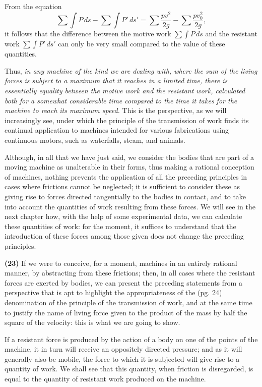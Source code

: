 \documentclass{book}
\begin{document}
From the equation \[\sum \int P \, ds - \sum \int P' \, ds' = \sum \frac{pv^2}{2g} - \sum \frac{pv_0^2}{2g},\] it follows that the difference between the motive work \(\sum \int P \, ds\) and the resistant work \(\sum \int P' \, ds'\) can only be very small compared to the value of these quantities. 

Thus, \textit{in any machine of the kind we are dealing with, where the sum of the living forces is subject to a maximum that it reaches in a limited time, there is essentially equality between the motive work and the resistant work, calculated both for a somewhat considerable time compared to the time it takes for the machine to reach its maximum speed.} This is the perspective, as we will increasingly see, under which the principle of the transmission of work finds its continual application to machines intended for various fabrications using continuous motors, such as waterfalls, steam, and animals.

Although, in all that we have just said, we consider the bodies that are part of a moving machine as unalterable in their forms, thus making a rational conception of machines, nothing prevents the application of all the preceding principles in cases where frictions cannot be neglected; it is sufficient to consider these as giving rise to forces directed tangentially to the bodies in contact, and to take into account the quantities of work resulting from these forces. We will see in the next chapter how, with the help of some experimental data, we can calculate these quantities of work: for the moment, it suffices to understand that the introduction of these forces among those given does not change the preceding principles.

\textbf{(23)} If we were to conceive, for a moment, machines in an entirely rational manner, by abstracting from these frictions; then, in all cases where the resistant forces are exerted by bodies, we can present the preceding statements from a perspective that is apt to highlight the appropriateness of the
\newpage
(pg. 24)\\
denomination of the principle of the transmission of work, and at the same time to justify the name of living force given to the product of the mass by half the square of the velocity: this is what we are going to show.

If a resistant force is produced by the action of a body on one of the points of the machine, it in turn will receive an oppositely directed pressure; and as it will generally also be mobile, the force to which it is subjected will give rise to a quantity of work. We shall see that this quantity, when friction is disregarded, is equal to the quantity of resistant work produced on the machine.
\end{document}
